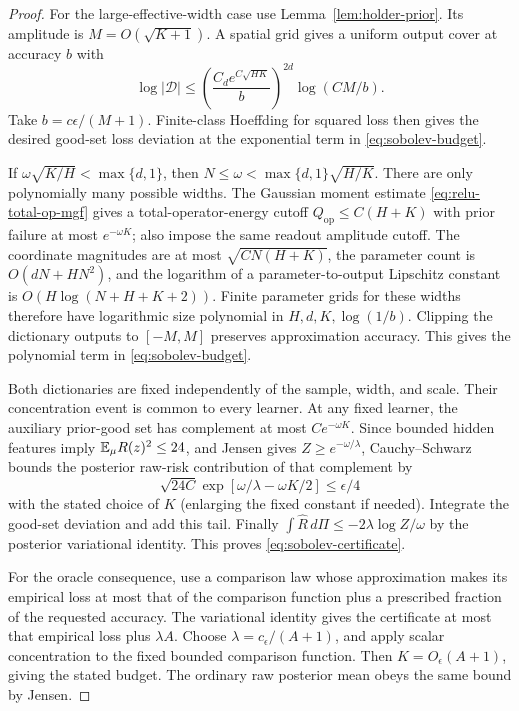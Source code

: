 \begin{proof}
For the large-effective-width case use Lemma~\ref{lem:holder-prior}. Its amplitude is $M=O(\sqrt{K+1})$. A spatial grid gives a uniform output cover at accuracy $b$ with
\[
 \log|\mathcal D|\le
 \left(\frac{C_d e^{C\sqrt{HK}}}{b}\right)^{2d}
                         \log(CM/b).
\]
Take $b=c\epsilon/(M+1)$. Finite-class Hoeffding for squared loss then gives the desired good-set loss deviation at the exponential term in \eqref{eq:sobolev-budget}.

If $\omega\sqrt{K/H}<\max\{d,1\}$, then
$N\le\omega<\max\{d,1\}\sqrt{H/K}$.
There are only polynomially many possible widths. The Gaussian moment estimate \eqref{eq:relu-total-op-mgf} gives a total-operator-energy cutoff $Q_{\mathrm{op}}\le C(H+K)$ with prior failure at most $e^{-\omega K}$; also impose the same readout amplitude cutoff. The coordinate magnitudes are at most $\sqrt{CN(H+K)}$, the parameter count is $O(dN+HN^2)$, and the logarithm of a parameter-to-output Lipschitz constant is $O(H\log(N+H+K+2))$. Finite parameter grids for these widths therefore have logarithmic size polynomial in $H,d,K,\log(1/b)$. Clipping the dictionary outputs to $[-M,M]$ preserves approximation accuracy. This gives the polynomial term in \eqref{eq:sobolev-budget}.

Both dictionaries are fixed independently of the sample, width, and scale. Their concentration event is common to every learner. At any fixed learner, the auxiliary prior-good set has complement at most $C e^{-\omega K}$. Since bounded hidden features imply $\mathbb E_\mu R(z)^2\le24$, and Jensen gives $Z\ge e^{-\omega/\lambda}$, Cauchy--Schwarz bounds the posterior raw-risk contribution of that complement by
\[
 \sqrt{24C}\exp[\omega/\lambda-\omega K/2]\le\epsilon/4
\]
with the stated choice of $K$ (enlarging the fixed constant if needed).
Integrate the good-set deviation and add this tail. Finally
$\int\widehat R\,d\Pi\le-2\lambda\log Z/\omega$ by the posterior variational identity. This proves \eqref{eq:sobolev-certificate}.

For the oracle consequence, use a comparison law whose approximation makes its empirical loss at most that of the comparison function plus a prescribed fraction of the requested accuracy. The variational identity gives the certificate at most that empirical loss plus $\lambda A$. Choose $\lambda=c_\epsilon/(A+1)$, and apply scalar concentration to the fixed bounded comparison function. Then $K=O_\epsilon(A+1)$, giving the stated budget. The ordinary raw posterior mean obeys the same bound by Jensen.
\end{proof}

